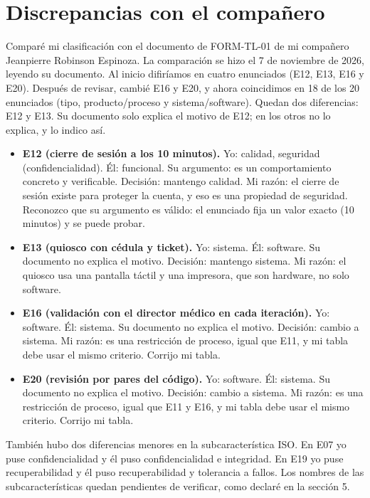 \documentclass[11pt,a4paper]{article}
\begin{document}
\section{Discrepancias con el compañero}
Comparé mi clasificación con el documento de FORM-TL-01 de mi compañero
Jeanpierre Robinson Espinoza. La comparación se hizo el 7 de noviembre de 2026,
leyendo su documento. Al inicio difiríamos en cuatro enunciados (E12, E13, E16
y E20). Después de revisar, cambié E16 y E20, y ahora coincidimos en 18 de los
20 enunciados (tipo, producto/proceso y sistema/software). Quedan dos
diferencias: E12 y E13. Su documento solo explica el motivo de E12; en los
otros no lo explica, y lo indico así.
\begin{itemize}
  \item \textbf{E12 (cierre de sesión a los 10 minutos).}
        Yo: calidad, seguridad (confidencialidad). Él: funcional.
        Su argumento: es un comportamiento concreto y verificable.
        Decisión: mantengo calidad. Mi razón: el cierre de sesión existe para
        proteger la cuenta, y eso es una propiedad de seguridad.
        Reconozco que su argumento es válido: el enunciado fija un valor exacto
        (10 minutos) y se puede probar.

  \item \textbf{E13 (quiosco con cédula y ticket).}
        Yo: sistema. Él: software. Su documento no explica el motivo.
        Decisión: mantengo sistema. Mi razón: el quiosco usa una pantalla
        táctil y una impresora, que son hardware, no solo software.
  \item \textbf{E16 (validación con el director médico en cada iteración).}
        Yo: software. Él: sistema. Su documento no explica el motivo.
        Decisión: cambio a sistema. Mi razón: es una restricción de proceso,
        igual que E11, y mi tabla debe usar el mismo criterio. Corrijo mi tabla.

  \item \textbf{E20 (revisión por pares del código).}
        Yo: software. Él: sistema. Su documento no explica el motivo.
        Decisión: cambio a sistema. Mi razón: es una restricción de proceso,
        igual que E11 y E16, y mi tabla debe usar el mismo criterio.
        Corrijo mi tabla.
\end{itemize}

También hubo dos diferencias menores en la subcaracterística ISO. En E07 yo
puse confidencialidad y él puso confidencialidad e integridad. En E19 yo puse
recuperabilidad y él puso recuperabilidad y tolerancia a fallos. Los nombres de
las subcaracterísticas quedan pendientes de verificar, como declaré en la
sección 5.
\end{document}
